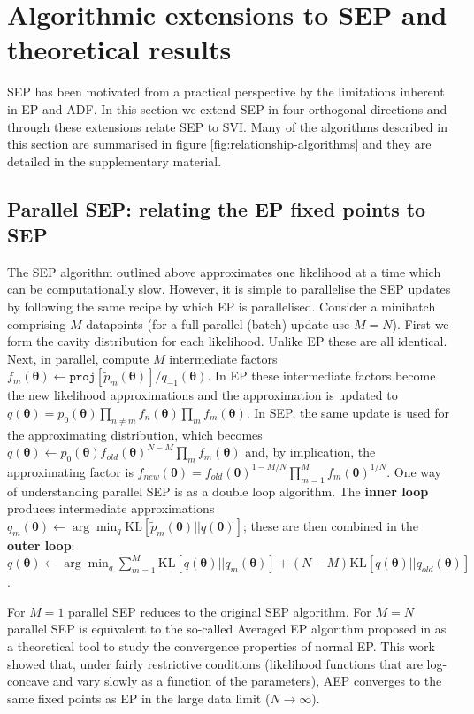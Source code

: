 \section{Algorithmic extensions to SEP and theoretical results}
%
SEP has been motivated from a practical perspective by the limitations inherent in EP and ADF. In this section we extend SEP in four orthogonal directions and through these extensions relate SEP to SVI. Many of the algorithms described in this section are summarised in figure \ref{fig:relationship-algorithms} and they are detailed in the supplementary material.

%
\subsection{Parallel SEP: relating the EP fixed points to SEP}
%

The SEP algorithm outlined above approximates one likelihood at a time which can be computationally slow. However, it is simple to parallelise the SEP updates by following the same recipe by which EP is parallelised. Consider a minibatch comprising $M$ datapoints (for a full parallel (batch) update use $M=N$). First we form the cavity distribution for each likelihood. Unlike EP these are all identical. Next, in parallel, compute $M$ intermediate factors $f_m(\bm{\theta}) \leftarrow \mathtt{proj}[\tilde{p}_m(\bm{\theta})] / q_{-1}(\bm{\theta})$. In EP these intermediate factors become the new likelihood approximations and the approximation is updated to $q(\bm{\theta}) = p_0(\bm{\theta}) \prod_{n \ne m} f_n(\bm{\theta}) \prod_{m} f_m(\bm{\theta}) $. In SEP, the same update is used for the approximating distribution, which becomes $q(\bm{\theta}) \leftarrow p_0(\bm{\theta}) f_{old}(\bm{\theta})^{N-M} \prod_{m} f_m(\bm{\theta}) $ and, by implication, the approximating factor is $f_{new}(\bm{\theta}) = f_{old}(\bm{\theta})^{1-M/N} \prod_{m=1}^M f_m(\bm{\theta})^{1/N}$. One way of understanding parallel SEP is as a double loop algorithm. The \textbf{inner loop} produces intermediate approximations  $q_m(\bm{\theta}) \leftarrow \arg\min_q \mathrm{KL}[\tilde{p}_m(\bm{\theta}) ||q(\bm{\theta})]$; these are then combined in the \textbf{outer loop}: $q(\bm{\theta}) \leftarrow \arg\min_q \sum_{m=1}^M \mathrm{KL}[q(\bm{\theta}) ||q_m(\bm{\theta})] + (N-M) \mathrm{KL}[q(\bm{\theta}) || q_{old}(\bm{\theta})]$.
%

For $M=1$ parallel SEP reduces to the original SEP algorithm. For $M=N$ parallel SEP is equivalent to the so-called Averaged EP algorithm proposed in \cite{barthelme:aep} as a theoretical tool to study the convergence properties of normal EP. This work showed that, under fairly restrictive conditions (likelihood functions that are log-concave and vary slowly as a function of the parameters), AEP converges to the same fixed points as EP in the large data limit ($N \rightarrow \infty$).

